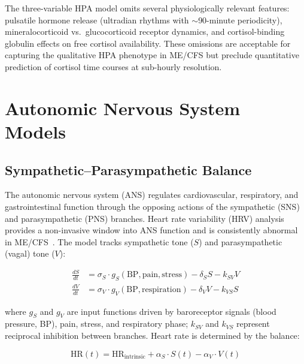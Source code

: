 \begin{limitation}
The three-variable HPA model omits several physiologically relevant features: pulsatile hormone release (ultradian rhythms with $\sim$90-minute periodicity), mineralocorticoid vs.\ glucocorticoid receptor dynamics, and cortisol-binding globulin effects on free cortisol availability. These omissions are acceptable for capturing the qualitative HPA phenotype in ME/CFS but preclude quantitative prediction of cortisol time courses at sub-hourly resolution.
\end{limitation}



\section{Autonomic Nervous System Models}
\label{sec:ans-models}

\subsection{Sympathetic--Parasympathetic Balance}
\label{sec:sympathetic-parasympathetic}

The autonomic nervous system (ANS) regulates cardiovascular, respiratory, and gastrointestinal function through the opposing actions of the sympathetic (SNS) and parasympathetic (PNS) branches. Heart rate variability (HRV) analysis provides a non-invasive window into ANS function and is consistently abnormal in ME/CFS~\cite{Newton2007}. The model tracks sympathetic tone ($S$) and parasympathetic (vagal) tone ($V$):

\begin{align}
\label{eq:ans-balance}
\frac{dS}{dt} &= \sigma_S \cdot g_S(\text{BP}, \text{pain}, \text{stress}) - \delta_S S - k_{SV} V \\
\frac{dV}{dt} &= \sigma_V \cdot g_V(\text{BP}, \text{respiration}) - \delta_V V - k_{VS} S
\end{align}

where $g_S$ and $g_V$ are input functions driven by baroreceptor signals (blood pressure, BP), pain, stress, and respiratory phase; $k_{SV}$ and $k_{VS}$ represent reciprocal inhibition between branches. Heart rate is determined by the balance:

\begin{equation}
\label{eq:heart-rate}
\text{HR}(t) = \text{HR}_{\text{intrinsic}} + \alpha_S \cdot S(t) - \alpha_V \cdot V(t)
\end{equation}

